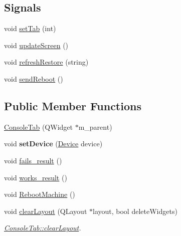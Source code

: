 \subsection*{Signals}
\begin{DoxyCompactItemize}
\item 
void \hyperlink{classConsoleTab_afbcbf3f97fa59e43aa9fe86c9549ebed}{set\+Tab} (int)
\item 
void \hyperlink{classConsoleTab_a741773c43f4a548ffd154022429a3830}{update\+Screen} ()
\item 
void \hyperlink{classConsoleTab_a34925515a836a363cf85b25860c795d6}{refresh\+Restore} (string)
\item 
void \hyperlink{classConsoleTab_af58a230f2f192469205839920dd7fa66}{send\+Reboot} ()
\end{DoxyCompactItemize}
\subsection*{Public Member Functions}
\begin{DoxyCompactItemize}
\item 
\hyperlink{classConsoleTab_a2c631d14f9fe5957e0622e10269e5115}{Console\+Tab} (Q\+Widget $\ast$m\+\_\+parent)
\item 
\mbox{\label{classConsoleTab_aa2b97a380a10d6100dc956d150ebd590}} 
void {\bfseries set\+Device} (\hyperlink{classDevice}{Device} device)
\item 
void \hyperlink{classConsoleTab_a7b2d0987db00c8b9af7ece7b36a82624}{fails\+\_\+result} ()
\item 
void \hyperlink{classConsoleTab_a866367073a3150527988f7cb841d5002}{works\+\_\+result} ()
\item 
void \hyperlink{classConsoleTab_a312dd40624d78a7d8506f97eb837c492}{Reboot\+Machine} ()
\item 
void \hyperlink{classConsoleTab_aae70e23b23e401b219edefcac4882eaf}{clear\+Layout} (Q\+Layout $\ast$layout, bool delete\+Widgets)
\begin{DoxyCompactList}\small\item\em \hyperlink{classConsoleTab_aae70e23b23e401b219edefcac4882eaf}{Console\+Tab\+::clear\+Layout}. \end{DoxyCompactList}\end{DoxyCompactItemize}
